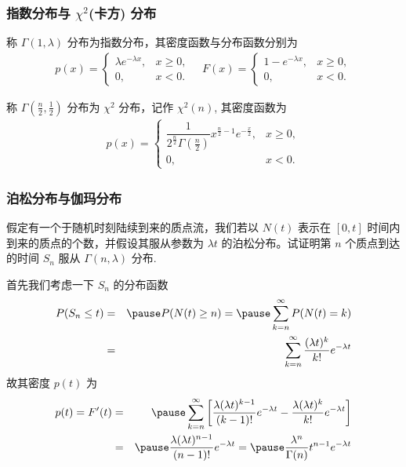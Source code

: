 \documentclass[Prob-All.tex]{subfiles}
\begin{document}
\begin{frame}
	\frametitle{指数分布与 $\chi^2$(卡方) 分布}
	\begin{defi}
		称 $\Gamma (1,\lambda)$ 分布为指数分布，其密度函数与分布函数分别为
		\begin{eqnarray*}
			p(x)=\left\{
			\begin{array}{ll}
				\lambda e^{-\lambda x}, & x\ge 0, \\
				0,                      & x<0.
			\end{array}
			\right.\quad
			F(x)=\left\{
			\begin{array}{ll}
				1- e^{-\lambda x}, & x\ge 0, \\
				0,                 & x<0.
			\end{array}
			\right.
		\end{eqnarray*}

	\end{defi}
	\pause

	\begin{defi}
		称 $\Gamma (\frac{n}{2},\frac{1}{2})$ 分布为 $\chi^2$ 分布，记作 $\chi^2 (n)$, 其密度函数为
		\begin{eqnarray*}
			p(x)=\left\{
			\begin{array}{ll}
				\dfrac{1}{2^{\frac{n}{2}}\Gamma(\frac{n}{2})}x^{\frac{n}{2}-1}e^{-\frac{x}{2}}, & x\ge 0, \\
				0,                                                                              & x<0.
			\end{array}
			\right.
		\end{eqnarray*}

	\end{defi}
\end{frame}

\begin{frame}
	\frametitle{泊松分布与伽玛分布}
	\begin{exam}
		假定有一个于随机时刻陆续到来的质点流，我们若以 $N (t)$ 表示在 $[0,t]$ 时间内到来的质点的个数，并假设其服从参数为 $\lambda t$ 的泊松分布。试证明第 $n$ 个质点到达的时间 $S_n$ 服从 $\Gamma (n,\lambda)$ 分布.
	\end{exam}

	\pause
	\zheng 首先我们考虑一下 $S_n$ 的分布函数
	\begin{eqnarray*}
		P(S_n\le t)&=&\pause P(N(t)\ge n)=\pause \sum_{k=n}^\infty P(N(t)=k)\\
		&=&\sum_{k=n}^\infty \dfrac{(\lambda t)^k}{k!}e^{-\lambda t}
	\end{eqnarray*}
	\pause 故其密度 $p (t)$ 为
	\begin{eqnarray*}
		p(t)=F'(t)&=&\pause \sum_{k=n}^\infty\left[ \dfrac{\lambda(\lambda t)^{k-1}}{(k-1)!}e^{-\lambda t} - \dfrac{\lambda(\lambda t)^k}{k!}e^{-\lambda t}\right]\\
		&=& \pause \dfrac{\lambda(\lambda t)^{n-1}}{(n-1)!}e^{-\lambda t}=\pause \dfrac{\lambda^n}{\Gamma(n)}t^{n-1}e^{-\lambda t}
	\end{eqnarray*}

\end{frame}
\end{document}
